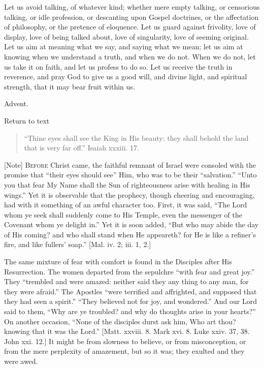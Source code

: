 Let us avoid talking, of whatever kind; whether mere empty talking,
or censorious talking, or idle profession, or descanting upon Gospel
doctrines, or the affectation of philosophy, or the pretence of
eloquence. Let us guard against frivolity, love of display, love of
being talked about, love of singularity, love of seeming original. Let
us aim at meaning what we say, and saying what we mean; let us aim at
knowing when we understand a truth, and when we do not. When we do
not, let us take it on faith, and let us profess to do so. Let us
receive the truth in reverence, and pray God to give us a good will,
and divine light, and spiritual strength, that it may bear fruit
within us.


Advent.

Return to text


\begin{quote}

``Thine eyes shall see the King in His beauty: they shall
behold the land that is very far off.'' Isaiah xxxiii. 17.

\end{quote}

[Note] B\textsc{efore} Christ came, the
faithful remnant of Israel were consoled with the promise that
``their eyes should see'' Him, who was to be their
``salvation.'' ``Unto you that fear My Name shall the Sun
of righteousness arise with healing in His wings.'' Yet it is
observable that the prophecy, though cheering and encouraging, had
with it something of an awful character too. First, it was said,
``The Lord whom ye seek shall suddenly come to His Temple, even
the messenger of the Covenant whom ye delight in.'' Yet it is soon
added, ``But who may abide the day of His coming? and who shall
stand when He appeareth? for He is like a refiner's fire, and like
fullers' soap.'' [Mal. iv. 2; iii. 1, 2.]

The same mixture of fear with comfort is found in the Disciples
after His Resurrection. The women departed from the sepulchre
``with fear and great joy.'' They ``trembled and were
amazed: neither said they any thing to any man, for they were
afraid.'' The Apostles ``were terrified and affrighted, and
supposed that they had seen a spirit.'' ``They believed not
for joy, and wondered.'' And our Lord said to them, ``Why are
ye troubled? and why do thoughts arise in your hearts?'' On
another occasion, ``None of the disciples durst ask him, Who art
thou? knowing that it was the Lord.'' [Matt. xxviii. 8. Mark xvi.
8. Luke xxiv. 37, 38. John xxi. 12.] It might be from slowness to
believe, or from misconception, or from the mere perplexity of
amazement, but so it was; they exulted and they were awed.

